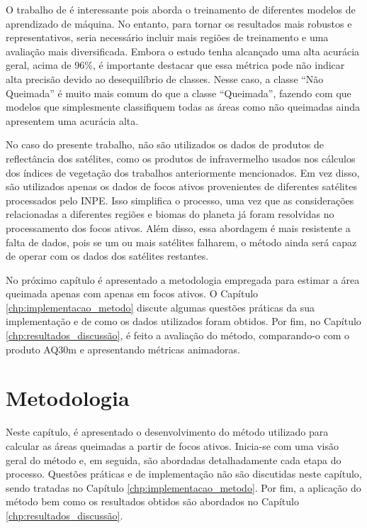 \documentclass[cic,tc]{iiufrgs}
\begin{document}
O trabalho de \citet{dosclassificaccao} é interessante pois aborda o treinamento de diferentes modelos de aprendizado de máquina. No entanto, para tornar os resultados mais robustos e representativos, seria necessário incluir mais regiões de treinamento e uma avaliação mais diversificada. Embora o estudo tenha alcançado uma alta acurácia geral, acima de 96\%, é importante destacar que essa métrica pode não indicar alta precisão devido ao desequilíbrio de classes. Nesse caso, a classe ``Não Queimada'' é muito mais comum do que a classe ``Queimada'', fazendo com que modelos que simplesmente classifiquem todas as áreas como não queimadas ainda apresentem uma acurácia alta.

No caso do presente trabalho, não são utilizados os dados de produtos de reflectância dos satélites, como os produtos de infravermelho usados nos cálculos dos índices de vegetação dos trabalhos anteriormente mencionados. Em vez disso, são utilizados apenas os dados de focos ativos provenientes de diferentes satélites processados pelo INPE. Isso simplifica o processo, uma vez que as considerações relacionadas a diferentes regiões e biomas do planeta já foram resolvidas no processamento dos focos ativos. Além disso, essa abordagem é mais resistente a falta de dados, pois se um ou mais satélites falharem, o método ainda será capaz de operar com os dados dos satélites restantes. 

No próximo capítulo é apresentado a metodologia empregada para estimar a área queimada apenas com apenas em focos ativos. O Capítulo \ref{chp:implementacao_metodo} discute algumas questões práticas da sua implementação e de como os dados utilizados foram obtidos. Por fim, no Capítulo \ref{chp:resultados_discussão}, é feito a avaliação do método, comparando-o com o produto AQ30m e apresentando métricas animadoras.




\chapter{Metodologia}
\label{chp:metodologia}

Neste capítulo, é apresentado o desenvolvimento do método utilizado para calcular as áreas queimadas a partir de focos ativos. Inicia-se com uma visão geral do método e, em seguida, são abordadas detalhadamente cada etapa do processo. Questões práticas e de implementação não são discutidas neste capítulo, sendo tratadas no Capítulo \ref{chp:implementacao_metodo}. Por fim, a aplicação do método bem como os resultados obtidos são abordados no Capítulo \ref{chp:resultados_discussão}.
\end{document}
